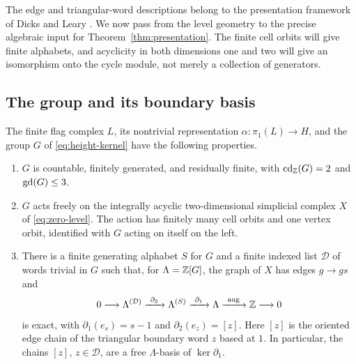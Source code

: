 The edge and triangular-word descriptions belong to the presentation
framework of Dicks and Leary \cite[Theorem~1 and Proposition~2]{DicksLeary1999}.
We now pass from the level geometry to the precise algebraic input for
Theorem~\ref{thm:presentation}. The finite cell orbits will give finite
alphabets, and acyclicity in both dimensions one and two will give an
isomorphism onto the cycle module, not merely a collection of generators.

\subsection{The group and its boundary basis}

\begin{proposition}\label{prop:model}
The finite flag complex $L$, its nontrivial representation
$\alpha:\pi_1(L)\to H$, and the group $G$ of
\eqref{eq:height-kernel} have the following properties.
\begin{enumerate}
\item $G$ is countable, finitely generated, and residually finite,
      with $\operatorname{cd}_{\mathbb Z}(G)=2$ and $\operatorname{gd}(G)\le3$.
\item $G$ acts freely on the integrally acyclic two-dimensional
      simplicial complex $X$ of \eqref{eq:zero-level}.  The action
      has finitely many cell orbits and one vertex orbit, identified
      with $G$ acting on itself on the left.
\item There is a finite generating alphabet $S$ for $G$ and a
      finite indexed list $\mathcal D$ of words trivial in $G$ such
      that, for $\Lambda=\mathbb Z[G]$, the graph of $X$ has edges
      $g\to gs$ and
      \begin{equation}\label{eq:model-resolution}
       0\longrightarrow\Lambda^{(\mathcal D)}
       \xrightarrow{\ \partial_2\ }\Lambda^{(S)}
       \xrightarrow{\ \partial_1\ }\Lambda
       \xrightarrow{\ \mathrm{aug}\ }\mathbb Z\longrightarrow0
      \end{equation}
      is exact, with $\partial_1(e_s)=s-1$ and
      $\partial_2(e_z)=[z]$.  Here $[z]$ is the oriented edge chain
      of the triangular boundary word $z$ based at $1$.
      In particular, the chains $[z]$, $z\in\mathcal D$, are a
      free $\Lambda$-basis of $\ker\partial_1$.
\end{enumerate}
\end{proposition}

